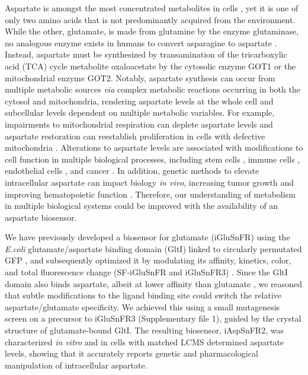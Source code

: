 \documentclass[9pt,lineno]{elife}
\begin{document}
Aspartate is amongst the most concentrated metabolites in cells \citep{Park2016-ap}, yet it is one of only two amino acids that is not predominantly acquired from the environment.
While the other, glutamate, is made from glutamine by the enzyme glutaminase, no analogous enzyme exists in humans to convert asparagine to aspartate \citep{Sullivan2018-gz}.
Instead, aspartate must be synthesized by transamination of the tricarboxylic acid (TCA) cycle metabolite oxaloacetate by the cytosolic enzyme GOT1 or the mitochondrial enzyme GOT2.
Notably, aspartate synthesis can occur from multiple metabolic sources \textit{via} complex metabolic reactions occurring in both the cytosol and mitochondria, rendering aspartate levels at the whole cell and subcellular levels dependent on multiple metabolic variables.
For example, impairments to mitochondrial respiration can deplete aspartate levels and aspartate restoration can reestablish proliferation in cells with defective mitochondria \citep{Sullivan2015-xf, Birsoy2015-pg, Cardaci2015-xy, Hart2023-gp}.
Alterations to aspartate levels are associated with modifications to cell function in multiple biological processes, including stem cells \citep{Tournaire2022-ut, Arnold2022-ft}, immune cells \citep{Bailis2019-mf}, endothelial cells \citep{Diebold2019-hh}, and cancer \citep{Helenius2021-ht}.
In addition, genetic methods to elevate intracellular aspartate can impact biology \textit{in vivo}, increasing tumor growth \citep{Sullivan2018-gz, Garcia-Bermudez2018-mj} and improving hematopoietic function \citep{Qi2021-jv}.
Therefore, our understanding of metabolism in multiple biological systems could be improved with the availability of an aspartate biosensor.

We have previously developed a biosensor for glutamate (iGluSnFR) using the \textit{E.coli} glutamate/aspartate binding domain (GltI) linked to circularly permutated GFP \citep{Marvin2013-qq}, and subsequently optimized it by modulating its affinity, kinetics, color, and total fluorescence change (SF-iGluSnFR and iGluSnFR3) \citep{Marvin2018-ks, Aggarwal2023-pi}.
Since the GltI domain also binds aspartate, albeit at lower affinity than glutamate  \citep{Hu2008-nd}, we reasoned that subtle modifications to the ligand binding site could switch the relative aspartate/glutamate specificity.
We achieved this using a small mutagenesis screen on a precursor to iGluSnFR3 (Supplementary file 1), guided by the crystal structure of glutamate-bound GltI.
The resulting biosensor, iAspSnFR2, was characterized \textit{in vitro} and in cells with matched LCMS determined aspartate levels, showing that it accurately reports genetic and pharmacological manipulation of intracellular aspartate.
\end{document}
